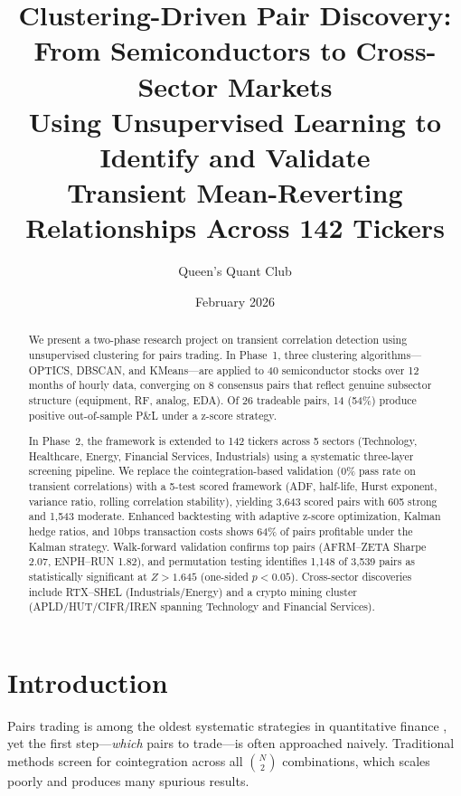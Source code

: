 \documentclass[11pt, a4paper]{article}
\title{
    \vspace{-1cm}
    \textbf{Clustering-Driven Pair Discovery:\\From Semiconductors to Cross-Sector Markets} \\[0.3cm]
    \large Using Unsupervised Learning to Identify and Validate \\
    Transient Mean-Reverting Relationships Across 142 Tickers
}
\author{
    Queen's Quant Club
}
\date{February 2026}
\begin{document}
\maketitle
\thispagestyle{fancy}

\begin{abstract}
We present a two-phase research project on transient correlation detection using unsupervised clustering for pairs trading. In Phase~1, three clustering algorithms---OPTICS, DBSCAN, and KMeans---are applied to 40 semiconductor stocks over 12 months of hourly data, converging on 8 consensus pairs that reflect genuine subsector structure (equipment, RF, analog, EDA). Of 26 tradeable pairs, 14 (54\%) produce positive out-of-sample P\&L under a z-score strategy.

In Phase~2, the framework is extended to 142 tickers across 5 sectors (Technology, Healthcare, Energy, Financial Services, Industrials) using a systematic three-layer screening pipeline. We replace the cointegration-based validation (0\% pass rate on transient correlations) with a 5-test scored framework (ADF, half-life, Hurst exponent, variance ratio, rolling correlation stability), yielding 3,643 scored pairs with 605 strong and 1,543 moderate. Enhanced backtesting with adaptive z-score optimization, Kalman hedge ratios, and 10bps transaction costs shows 64\% of pairs profitable under the Kalman strategy. Walk-forward validation confirms top pairs (AFRM--ZETA Sharpe 2.07, ENPH--RUN 1.82), and permutation testing identifies 1,148 of 3,539 pairs as statistically significant at $Z > 1.645$ (one-sided $p < 0.05$). Cross-sector discoveries include RTX--SHEL (Industrials/Energy) and a crypto mining cluster (APLD/HUT/CIFR/IREN spanning Technology and Financial Services).
\end{abstract}

\tableofcontents
\newpage

\section{Introduction}

Pairs trading is among the oldest systematic strategies in quantitative finance \cite{gatev2006, vidyamurthy2004}, yet the first step---\textit{which} pairs to trade---is often approached naively. Traditional methods screen for cointegration \cite{engle1987} across all $\binom{N}{2}$ combinations, which scales poorly and produces many spurious results.
\end{document}
